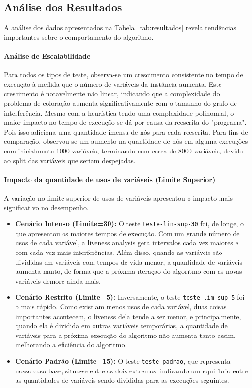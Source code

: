\subsection{Análise dos Resultados}

A análise dos dados apresentados na Tabela~\ref{tab:resultados} revela tendências importantes sobre o comportamento do algoritmo.

\paragraph{Análise de Escalabilidade} Para todos os tipos de teste, observa-se um crescimento consistente no tempo de execução à medida que 
o número de variáveis da instância aumenta. Este crescimento é notavelmente não linear, indicando que a complexidade do problema de coloração
aumenta significativamente com o tamanho do grafo de interferência. Mesmo com a heurística tendo uma complexidade polinomial, o maior impacto no tempo
de execução se dá por causa da reescrita do "programa". Pois isso adiciona uma quantidade imensa de nós para cada reescrita. Para fins de comparação, observou-se
um aumento na quantidade de nós em alguma execuções com inicialmente 1000 variáveis, terminando com cerca de 8000 variáveis, devido ao split das variáveis que seriam
despejadas.


\paragraph{Impacto da quantidade de usos de variáveis (Limite Superior)} A variação no limite superior de usos de variáveis apresentou o impacto
mais significativo no desempenho.
\begin{itemize}
    \item \textbf{Cenário Intenso (Limite=30):} O teste \texttt{teste-lim-sup-30} foi, de longe, o que apresentou os maiores tempos de execução. Com um grande número de usos de cada variável, a liveness analysis gera intervalos cada vez maiores e com cada vez mais interferências. Além disso, quando as variáveis são divididas em variáveis com tempos de vida menor, a quantidade de variáveis aumenta muito, de forma que a próxima iteração do algoritmo com as novas variáveis demore ainda mais.
    \item \textbf{Cenário Restrito (Limite=5):} Inversamente, o teste \texttt{teste-lim-sup-5} foi o mais rápido. Como existiam menos usos de cada variável, duas coisas importantes acontecem, o liveness dela tende a ser menor, e principalmente, quando ela é dividida em outras variáveis temporárias, a quantidade de variáveis para a próxima execução do algoritmo não aumenta tanto assim, melhorando a eficiência do algoritmo.
    \item \textbf{Cenário Padrão (Limite=15):} O teste \texttt{teste-padrao}, que representa nosso caso base, situa-se entre os dois extremos, indicando um equilíbrio entre as quantidades de variáveis sendo divididas para as execuções seguintes.
\end{itemize}

